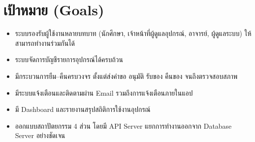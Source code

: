 \section{เป้าหมาย (Goals)}


\begin{itemize}
  \item ระบบรองรับผู้ใช้งานหลายบทบาท (นักศึกษา, เจ้าหน้าที่ผู้ดูแลอุปกรณ์, อาจารย์, ผู้ดูแลระบบ) ให้สามารถทำงานร่วมกันได้
  \item ระบบจัดการบัญชีรายการอุปกรณ์ได้ครบถ้วน
  \item มีกระบวนการยืม–คืนครบวงจร ตั้งแต่ส่งคำขอ อนุมัติ รับของ คืนของ จนถึงตรวจสอบสภาพ
  \item มีระบบแจ้งเตือนและติดตามผ่าน Email รวมถึงการแจ้งเตือนภายในแอป
  \item มี Dashboard และรายงานสรุปสถิติการใช้งานอุปกรณ์
  \item ออกแบบสถาปัตยกรรม 4 ส่วน โดยมี API Server แยกการทำงานออกจาก Database Server อย่างชัดเจน
\end{itemize}
